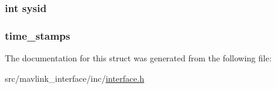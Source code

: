 \subsubsection[{\texorpdfstring{sysid}{sysid}}]{\setlength{\rightskip}{0pt plus 5cm}int sysid}\hypertarget{struct_mavlink___messages_a7a9e72f297c762c6d1b36c4c1f83a7ec}{}\label{struct_mavlink___messages_a7a9e72f297c762c6d1b36c4c1f83a7ec}
\subsubsection[{\texorpdfstring{time\+\_\+stamps}{time_stamps}}]{ time\+\_\+stamps}\hypertarget{struct_mavlink___messages_aaa9e25fa47c4a823e4d15ce2798286f1}{}\label{struct_mavlink___messages_aaa9e25fa47c4a823e4d15ce2798286f1}


The documentation for this struct was generated from the following file\+:\begin{DoxyCompactItemize}
\item 
src/mavlink\+\_\+interface/inc/\hyperlink{interface_8h}{interface.\+h}\end{DoxyCompactItemize}
